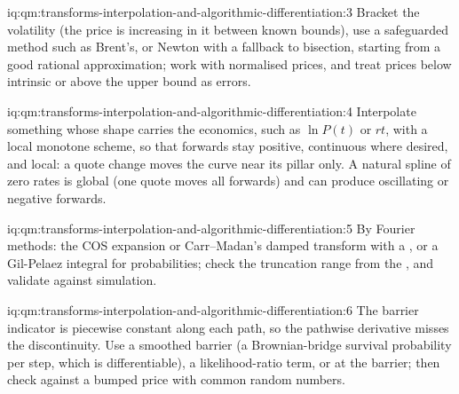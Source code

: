\begin{solution}{iq:qm:transforms-interpolation-and-algorithmic-differentiation:3}
Bracket the volatility (the price is increasing in it between known bounds), use a safeguarded method such as Brent's, or Newton with a fallback to bisection, starting from a good rational
approximation; work with normalised prices, and treat prices below intrinsic or above the upper bound as errors.
\end{solution}

\begin{solution}{iq:qm:transforms-interpolation-and-algorithmic-differentiation:4}
Interpolate something whose shape carries the economics, such as $\ln P(t)$ or $rt$, with a local monotone scheme, so that forwards stay positive, continuous where desired, and local: a quote change
moves the curve near its pillar only. A natural spline of zero rates is global (one quote moves all forwards) and can produce oscillating or negative forwards.
\end{solution}

\begin{solution}{iq:qm:transforms-interpolation-and-algorithmic-differentiation:5}
By Fourier methods: the COS expansion or Carr--Madan's damped transform with a , or a Gil-Pelaez integral for probabilities; check the truncation range from the , and
validate against simulation.
\end{solution}

\begin{solution}{iq:qm:transforms-interpolation-and-algorithmic-differentiation:6}
The barrier indicator is piecewise constant along each path, so the pathwise derivative misses the discontinuity. Use a smoothed barrier (a Brownian-bridge survival probability per step, which is
differentiable), a likelihood-ratio term, or  at the barrier; then check against a bumped price with common random numbers.
\end{solution}
